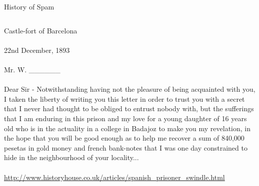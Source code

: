 \documentclass[nobackground,dvipsnames,table]{beamer}
\begin{document}
\begin{frame}{History of Spam}
    \scriptsize
    \begin{columns}
            Castle-fort of Barcelona\\~\\
            22nd December, 1893\\~\\
            Mr. W. ______\\~\\
            Dear Sir - Notwithstanding having not the pleasure of being acquainted with you, I taken the liberty of writing you this letter in order to trust you with a secret that I never had thought to be obliged to entrust nobody with, but the sufferings that I am enduring in this prison and my love for a young daughter of 16 years old who is in the actuality in a college in Badajoz to make you my revelation, in the hope that you will be good enough as to help me recover a sum of 840,000 pesetas in gold money and french bank-notes that I was one day constrained to hide in the neighbourhood of your locality...\\~\\
            \url{http://www.historyhouse.co.uk/articles/spanish_prisoner_swindle.html}


\end{columns}
\end{frame}
\end{document}
